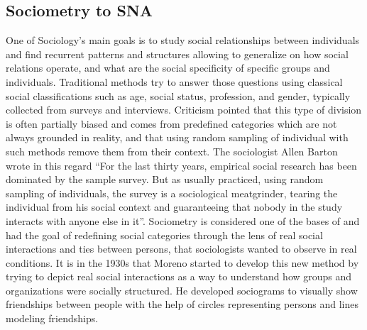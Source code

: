 \subsection{Sociometry to SNA}

One of Sociology's main goals is to study social relationships between individuals and find recurrent patterns and structures allowing to generalize on how social relations operate, and what are the social specificity of specific groups and individuals\cite{scottSocialNetworkAnalysis1988}.
Traditional methods try to answer those questions using classical social classifications such as age, social status, profession, and gender, typically collected from surveys and interviews.
Criticism pointed that this type of division is often partially biased and comes from predefined categories which are not always grounded in reality\cite{freemanDevelopmentSocialNetwork2004}, and that using random sampling of individual with such methods remove them from their context.
The sociologist Allen Barton wrote in this regard ``For the last thirty years, empirical social research has been dominated by the sample survey. But as usually practiced, using random sampling of individuals, the survey is a sociological meatgrinder, tearing the individual from his social context and guaranteeing that nobody in the study interacts with anyone else in it''\cite{bartonSurveyResearchMacroMethodology1968}.
Sociometry is considered one of the bases of \sna and had the goal of redefining social categories through the lens of real social interactions and ties between persons, that sociologists wanted to observe in real conditions.
It is in the 1930s that Moreno started to develop this new method by trying to depict real social interactions as a way to understand how groups and organizations were socially structured\cite{morenoFoundationsSociometryIntroduction1941}.
He developed sociograms to visually show friendships between people with the help of circles representing persons and lines modeling friendships.


